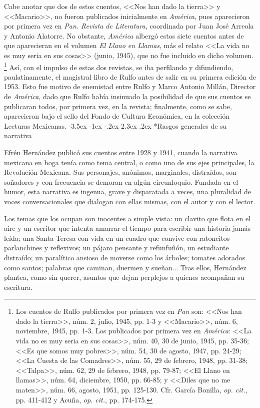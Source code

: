 \documentclass[14pt,twoside,final]{extbook} %
\makeatletter
\let\oldfootnote\footnote
\renewcommand\footnote[1]{%
\oldfootnote{\hspace{1mm}#1}}
\renewcommand\section{\@startsection {section}{1}{\z@}%
                                     {-3.5ex \@plus -1ex \@minus -.2ex}%
                                     {2.3ex \@plus .2ex}%
                                     {\normalfont\large\bfseries\sc}}
\makeatother
\begin{document}
Cabe anotar que dos de estos cuentos, <<Nos han dado la tierra>> y <<Macario>>, no fueron publicados inicialmente en \emph{América}, pues aparecieron por primera vez en \emph{Pan. Revista de Literatura}, coordinada por Juan José Arreola y Antonio Alatorre. No obstante, \emph{América} albergó estos siete cuentos antes de que aparecieran en el volumen \emph{El Llano en Llamas}, más el relato <<La vida no es muy seria en sus cosas>> (junio, 1945), que no fue incluido en dicho volumen.\footnote{Los cuentos de Rulfo publicados por primera vez en \emph{Pan} son: <<Nos han dado la tierra>>, núm. 2, julio, 1945, pp. 1-3 y <<Macario>>, núm. 6, noviembre, 1945, pp. 1-3. Los publicados por primera vez en \emph{América}: <<La vida no es muy seria en sus cosas>>, núm. 40, 30 de junio, 1945, pp. 35-36; <<Es que somos muy pobres>>, núm. 54, 30 de agosto, 1947, pp. 24-29; <<La Cuesta de las Comadres>>, núm. 55, 29 de febrero, 1948, pp. 31-38; <<Talpa>>, núm. 62, 29 de febrero, 1948, pp. 79-87; <<El Llano en llamas>>, núm. 64, diciembre, 1950, pp. 66-85; y <<Diles que no me maten>>, núm. 66, agosto, 1951, pp. 125-130. Cfr. García Bonilla, \emph{op. cit.}, pp. 411-412 y Acuña, \emph{op. cit.}, pp. 174-175.} Así, con el impulso de estas dos revistas, se iba perfilando y difundiendo, paulatinamente, el magistral libro de Rulfo antes de salir en su primera edición de 1953. Esto fue motivo de enemistad entre Rulfo y Marco Antonio Millán, Director de \emph{América}, dado que Rulfo había insinuado la posibilidad de que sus cuentos se publicaran todos, por primera vez, en la revista; finalmente, como se sabe, aparecieron bajo el sello del Fondo de Cultura Económica, en la colección Lecturas Mexicanas.
\section*{Rasgos generales de su narrativa}\label{sec:rasgos-generales-de-su-narrativa}
Efrén Hernández publicó sus cuentos entre 1928 y 1941, cuando la narrativa mexicana en boga tenía como tema central, o como uno de sus ejes principales, la Revolución Mexicana. Sus personajes, anónimos, marginales, distraídos, son soñadores y con frecuencia se demoran en algún circunloquio. Fundada en el humor, esta narrativa es ingenua, grave y disparatada a veces, una pluralidad de voces conversacionales que dialogan con ellas mismas, con el autor y con el lector.

Los temas que los ocupan son inocentes a simple vista: un clavito que flota en el aire y un escritor que intenta amarrar el tiempo para escribir una historia jamás
leída; una Santa Teresa con vida en un cuadro que convive con ratoncitos parlanchines y reflexivos; un pájaro pensante y refunfuñón, un estudiante distraído; un paralítico ansioso de moverse como los árboles; tomates adorados como santos; palabras que caminan, duermen y sueñan... Tras ellos, Hernández plantea, como
sin querer, asuntos que dejan perplejos a quienes acompañan su escritura.
\end{document}
